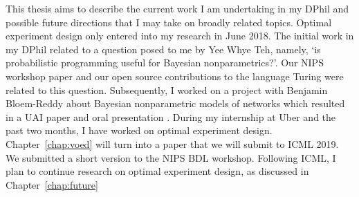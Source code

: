 This thesis aims to describe the current work I am undertaking in my DPhil and possible future directions that I may take on broadly related topics. Optimal experiment design only entered into my research in June 2018. The initial work in my DPhil related to a question posed to me by Yee Whye Teh, namely, `is probabilistic programming useful for Bayesian nonparametrics?'. Our NIPS workshop paper \cite{bnpppl} and our open source contributions to the language Turing were related to this question. Subsequently, I worked on a project with Benjamin Bloem-Reddy about Bayesian nonparametric models of networks which resulted in a UAI paper and oral presentation \cite{bntl}. During my internship at Uber and the past two months, I have worked on optimal experiment design. Chapter~\ref{chap:voed} will turn into a paper that we will submit to ICML 2019. We submitted a short version to the NIPS BDL workshop. Following ICML, I plan to continue research on optimal experiment design, as discussed in Chapter~\ref{chap:future}